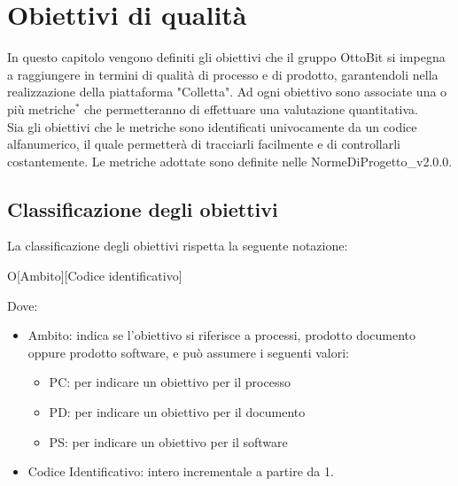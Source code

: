 \section{Obiettivi di qualità}
In questo capitolo vengono definiti gli obiettivi che il gruppo OttoBit si impegna a raggiungere in termini di qualità di processo e di prodotto, garantendoli nella realizzazione della piattaforma "Colletta". Ad ogni obiettivo sono associate una o più metriche$^*$ che permetteranno di effettuare una valutazione quantitativa. \\
Sia gli obiettivi che le metriche sono identificati univocamente da un codice alfanumerico, il quale permetterà di tracciarli facilmente e di controllarli costantemente. Le metriche adottate sono definite nelle NormeDiProgetto\_v2.0.0.

\subsection{Classificazione degli obiettivi}
La classificazione degli obiettivi rispetta la seguente notazione:
\begin{center}
	O[Ambito][Codice identificativo]
\end{center}

Dove:
\begin{itemize}
	\item Ambito: indica se l'obiettivo si riferisce a processi, prodotto documento oppure prodotto software, e può assumere i seguenti valori:
	\begin{itemize}
		\item PC: per indicare un obiettivo per il processo
		\item PD: per indicare un obiettivo per il documento
		\item PS: per indicare un obiettivo per il software
	\end{itemize}
	
	\item Codice Identificativo: intero incrementale a partire da 1.
	
\end{itemize}

